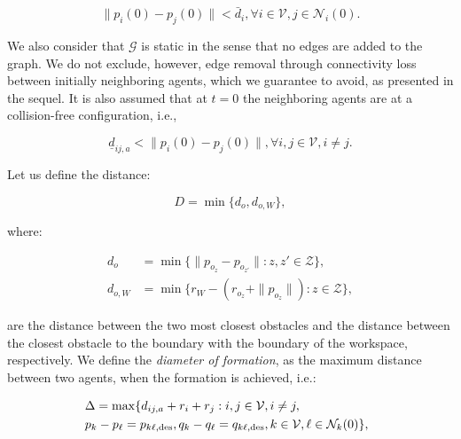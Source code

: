 \begin{equation} \label{eq:initially_connected}
\| p_i(0)-p_j(0) \| < \bar{d}_{i}, \forall i \in \mathcal{V}, j \in \mathcal{N}_i(0).
\end{equation}

We also consider that $\mathcal{G}$ is static in the sense that no edges are
added to the graph. We do not exclude, however, edge removal through
connectivity loss between initially neighboring agents, which we guarantee
to avoid, as presented in the sequel. It is also assumed that at $t=0$ the
neighboring agents are at a collision-free configuration, i.e.,

\begin{equation} \label{eq:initially_coll_free}
\underline{d}_{ij, a} < \| p_i(0)-p_j(0)\|, \forall i,j \in \mathcal{V}, i \neq j.
\end{equation}

Let us define the distance:

\begin{equation*}
D = \min\{d_o, d_{o,W}\},
\end{equation*}

where:

\begin{align*}
d_o &= \min\{\| p_{o_z} - p_{o_{z'}}\| : z,z' \in \mathcal{Z} \}, \\
d_{o,W} &= \min\{r_W - \left( r_{o_z} + \| p_{o_z} \| \right) : z \in \mathcal{Z}\},
\end{align*}

are the distance between the two most closest obstacles and the distance between
the closest obstacle to the boundary with the boundary of the workspace,
respectively. We define the \emph{diameter of formation}, as the maximum
distance between two agents, when the formation is achieved, i.e.:

\begin{align*}
&\hspace{-2mm} \Delta =  \max\{d_{ij, a}+r_i+r_j: i, j \in \mathcal{V}, i \neq j, \notag \\
&\hspace{-2mm} p_k - p_\ell = p_{k \ell,\text{des}}, q_k-q_\ell = q_{k \ell,\text{des}}, k \in \mathcal{V}, \ell \in \mathcal{N}_k(0)\},
\end{align*}

